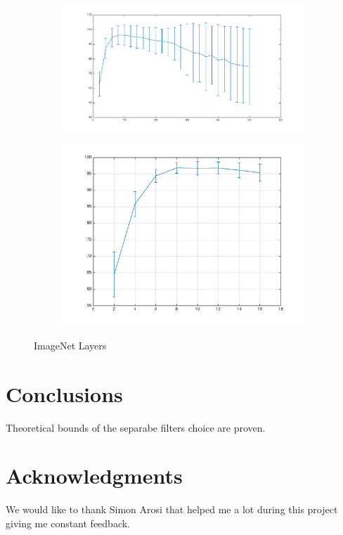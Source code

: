 \documentclass{article} %
\begin{document}
\begin{figure}[h]
  \centering
  \begin{subfigure}[b]{0.40\textwidth}
   \includegraphics[width=\textwidth]{images/Layer3ImageNet.png}
    \caption{}
  \end{subfigure}
  \begin{subfigure}[b]{0.40\textwidth}
    \includegraphics[width=\textwidth]{images/Layer4ImageNet.png}
    \caption{}
  \end{subfigure}
  \caption{ImageNet Layers}
  \label{fig:user_artiststribution}
\end{figure}

\section{Conclusions}
Theoretical bounds of the separabe filters choice are proven.


\section*{Acknowledgments}
We would like to thank Simon Arosi that helped me a lot during this project giving me constant feedback.



\end{document}
